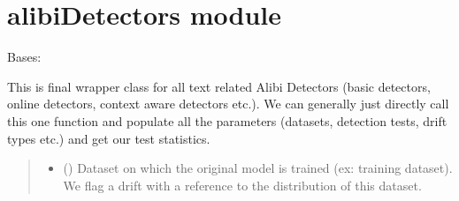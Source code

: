 \documentclass[letterpaper,10pt,english]{sphinxmanual}
\begin{document}
\sphinxstepscope


\section{alibiDetectors module}
\label{\detokenize{alibiModules/alibiDetectors:module-alibiDetectors}}\label{\detokenize{alibiModules/alibiDetectors:alibidetectors-module}}\label{\detokenize{alibiModules/alibiDetectors::doc}}

\begin{fulllineitems}
\label{\detokenize{alibiModules/alibiDetectors:alibiDetectors.alibiDetectors}}
\pysigstartsignatures
{}
\pysigstopsignatures
\sphinxAtStartPar
Bases: {\hyperref[\detokenize{baseModules/base:base.detectorParent}]{}}

\begin{fulllineitems}
\label{\detokenize{alibiModules/alibiDetectors:alibiDetectors.alibiDetectors.__init__}}
\pysigstartsignatures
{}
\pysigstopsignatures
\sphinxAtStartPar
This is final wrapper class for all text related Alibi Detectors (basic detectors, online
detectors, context aware detectors etc.). We can generally just directly call this one function
and populate all the parameters (datasets, detection tests, drift types etc.) and get our test
statistics.
\begin{quote}\begin{description}
\begin{itemize}
\item {} 
\sphinxAtStartPar
{} (\sphinxstyleliteralemphasis{\sphinxupquote{, }}) \textendash{} Dataset on which the original model is trained (ex: training dataset). We flag a drift
with a reference to the distribution of this dataset.


\end{itemize}
\end{description}
\end{quote}
\end{fulllineitems}
\end{fulllineitems}
\end{document}
